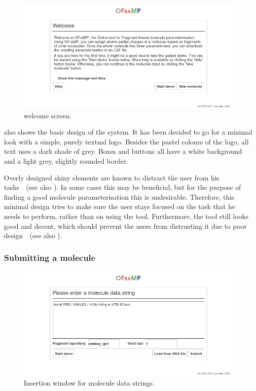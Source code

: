 \begin{figure}
\center
\includegraphics[width=.9\textwidth]{img/impl_welcome.png}
\caption{\oframp{} welcome screen.}
\end{figure}

 also shows the basic design of the system. It has been decided to go for a minimal look with a simple, purely textual logo. Besides the pastel colours of the logo, all text uses a dark shade of grey. Boxes and buttons all have a white background and a light grey, slightly rounded border.

Overly designed shiny elements are known to distract the user from his tasks~\cite{norman1990interfaces}~(see also ). In some cases this may be beneficial, but for the purpose of finding a good molecule parameterisation this is undesirable. Therefore, this minimal design tries to make sure the user stays focused on the task that he needs to perform, rather than on using the tool. Furthermore, the tool still looks good and decent, which should prevent the users from distrusting it due to poor design~\cite{norman2002emotion}~(see also ).

\subsubsection{Submitting a molecule}

\begin{figure}
\center
\includegraphics[width=.9\textwidth]{img/impl_inserting.png}
\caption{Insertion window for molecule data strings.}
\end{figure}


